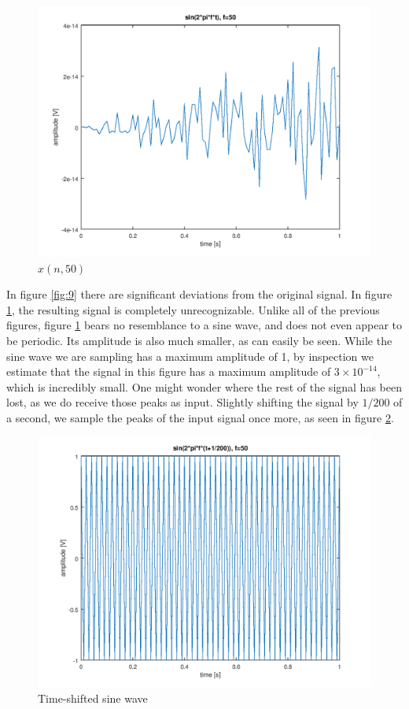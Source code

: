 \documentclass[a4paper, 12pt]{report}
\begin{document}
			\begin{figure}[H]
				\label{fig:10}
				\includegraphics[width=\textwidth]{img/1_10.png}
				\caption{$x(n, 50)$}
			\end{figure}

			In figure \ref{fig:9} there are significant deviations from the original signal. In figure \ref{fig:10}, the resulting signal is completely unrecognizable. Unlike all of the previous figures, figure \ref{fig:10} bears no resemblance to a sine wave, and does not even appear to be periodic. Its amplitude is also much smaller, as can easily be seen. While the sine wave we are sampling has a maximum amplitude of 1, by inspection we estimate that the signal in this figure has a maximum amplitude of $3\times10^{-14}$, which is incredibly small. One might wonder where the rest of the signal has been lost, as we do receive those peaks as input. Slightly shifting the signal by $1/200$ of a second, we sample the peaks of the input signal once more, as seen in figure \ref{fig:11}.

			\begin{figure}[H]
				\label{fig:11}
				\includegraphics[width=\textwidth]{img/1_11_shift.png}
				\caption{Time-shifted sine wave}
			\end{figure}
\end{document}
